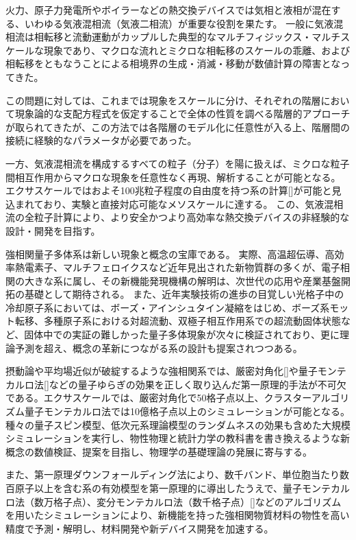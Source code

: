 火力、原子力発電所やボイラーなどの熱交換デバイスでは気相と液相が混在する、いわゆる気液混相流（気液二相流）が重要な役割を果たす。
一般に気液混相流は相転移と流動運動がカップルした典型的なマルチフィジックス・マルチスケールな現象であり、マクロな流れとミクロな相転移のスケールの乖離、および相転移をともなうことによる相境界の生成・消滅・移動が数値計算の障害となってきた。

この問題に対しては、これまでは現象をスケールに分け、それぞれの階層において現象論的な支配方程式を仮定することで全体の性質を調べる階層的アプローチが取られてきたが、この方法では各階層のモデル化に任意性が入る上、階層間の接続に経験的なパラメータが必要であった。

一方、気液混相流を構成するすべての粒子（分子）を陽に扱えば、ミクロな粒子間相互作用からマクロな現象を任意性なく再現、解析することが可能となる。
エクサスケールではおよそ100兆粒子程度の自由度を持つ系の計算[]が可能と見込まれており、実験と直接対応可能なメソスケールに達する。
この、気液混相流の全粒子計算により、より安全かつより高効率な熱交換デバイスの非経験的な設計・開発を目指す。


強相関量子多体系は新しい現象と概念の宝庫である。
実際、高温超伝導、高効率熱電素子、マルチフェロイクスなど近年見出された新物質群の多くが、電子相関の大きな系に属し、その新機能発現機構の解明は、次世代の応用や産業基盤開拓の基礎として期待される。
また、近年実験技術の進歩の目覚しい光格子中の冷却原子系においては、ボーズ・アインシュタイン凝縮をはじめ、ボーズ系モット転移、多種原子系における対超流動、双極子相互作用系での超流動固体状態など、固体中での実証の難しかった量子多体現象が次々に検証されており、更に理論予測を超え、概念の革新につながる系の設計も提案されつつある。

摂動論や平均場近似が破綻するような強相関系では、厳密対角化[]や量子モンテカルロ法[]などの量子ゆらぎの効果を正しく取り込んだ第一原理的手法が不可欠である。エクサスケールでは、厳密対角化で50格子点以上、クラスターアルゴリズム量子モンテカルロ法では10億格子点以上のシミュレーションが可能となる。
種々の量子スピン模型、低次元系理論模型のランダムネスの効果も含めた大規模シミュレーションを実行し、物性物理と統計力学の教科書を書き換えるような新概念の数値検証、提案を目指し、物理学の基礎理論の発展に寄与する。

また、第一原理ダウンフォールディング法により、数千バンド、単位胞当たり数百原子以上を含む系の有効模型を第一原理的に導出したうえで、量子モンテカルロ法（数万格子点）、変分モンテカルロ法（数千格子点）[]などのアルゴリズムを用いたシミュレーションにより、新機能を持った強相関物質材料の物性を高い精度で予測・解明し、材料開発や新デバイス開発を加速する。


